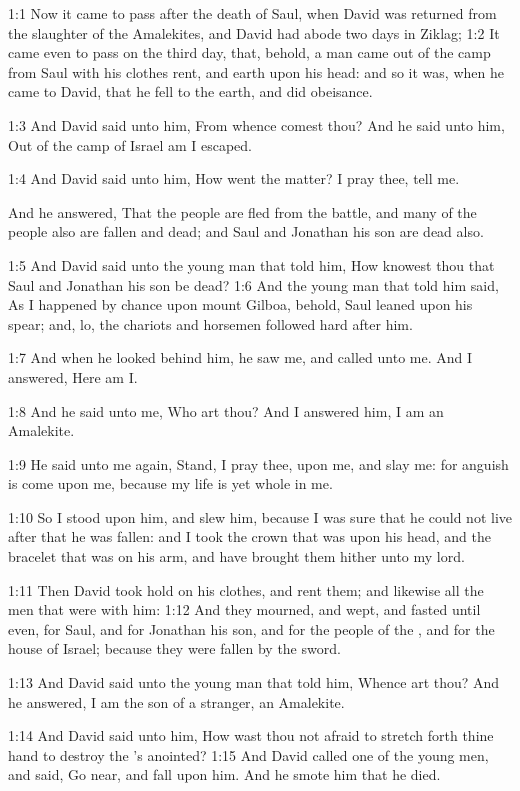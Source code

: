 
1:1 Now it came to pass after the death of Saul, when David was
returned from the slaughter of the Amalekites, and David had abode two
days in Ziklag; 1:2 It came even to pass on the third day, that,
behold, a man came out of the camp from Saul with his clothes rent,
and earth upon his head: and so it was, when he came to David, that he
fell to the earth, and did obeisance.

1:3 And David said unto him, From whence comest thou? And he said unto
him, Out of the camp of Israel am I escaped.

1:4 And David said unto him, How went the matter? I pray thee, tell
me.

And he answered, That the people are fled from the battle, and many of
the people also are fallen and dead; and Saul and Jonathan his son are
dead also.

1:5 And David said unto the young man that told him, How knowest thou
that Saul and Jonathan his son be dead?  1:6 And the young man that
told him said, As I happened by chance upon mount Gilboa, behold, Saul
leaned upon his spear; and, lo, the chariots and horsemen followed
hard after him.

1:7 And when he looked behind him, he saw me, and called unto me. And
I answered, Here am I.

1:8 And he said unto me, Who art thou? And I answered him, I am an
Amalekite.

1:9 He said unto me again, Stand, I pray thee, upon me, and slay me:
for anguish is come upon me, because my life is yet whole in me.

1:10 So I stood upon him, and slew him, because I was sure that he
could not live after that he was fallen: and I took the crown that was
upon his head, and the bracelet that was on his arm, and have brought
them hither unto my lord.

1:11 Then David took hold on his clothes, and rent them; and likewise
all the men that were with him: 1:12 And they mourned, and wept, and
fasted until even, for Saul, and for Jonathan his son, and for the
people of the \LORD, and for the house of Israel; because they were
fallen by the sword.

1:13 And David said unto the young man that told him, Whence art thou?
And he answered, I am the son of a stranger, an Amalekite.

1:14 And David said unto him, How wast thou not afraid to stretch
forth thine hand to destroy the \LORD's anointed?  1:15 And David
called one of the young men, and said, Go near, and fall upon him. And
he smote him that he died.

